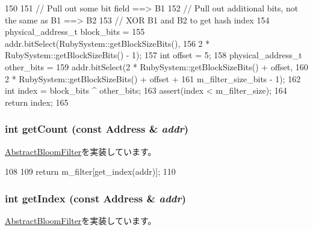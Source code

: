 \begin{DoxyCode}
150 {
151     // Pull out some bit field ==> B1
152     // Pull out additional bits, not the same as B1 ==> B2
153     //  XOR B1 and B2 to get hash index
154     physical_address_t block_bits =
155         addr.bitSelect(RubySystem::getBlockSizeBits(),
156                        2 * RubySystem::getBlockSizeBits() - 1);
157     int offset = 5;
158     physical_address_t other_bits =
159         addr.bitSelect(2 * RubySystem::getBlockSizeBits() + offset,
160                        2 * RubySystem::getBlockSizeBits() + offset +
161                        m_filter_size_bits - 1);
162     int index = block_bits ^ other_bits;
163     assert(index < m_filter_size);
164     return index;
165 }
\end{DoxyCode}
\hypertarget{classBlockBloomFilter_abb722634d5846105b673e9496df8d062}{
\subsubsection[{getCount}]{\setlength{\rightskip}{0pt plus 5cm}int getCount (const {\bf Address} \& {\em addr})}}
\label{classBlockBloomFilter_abb722634d5846105b673e9496df8d062}


\hyperlink{classAbstractBloomFilter_ab6253919ea6ff1b2c17506742b34147d}{AbstractBloomFilter}を実装しています。


\begin{DoxyCode}
108 {
109     return m_filter[get_index(addr)];
110 }
\end{DoxyCode}
\hypertarget{classBlockBloomFilter_a19f42f6f2fc3501021b768f0df8108b2}{
\subsubsection[{getIndex}]{\setlength{\rightskip}{0pt plus 5cm}int getIndex (const {\bf Address} \& {\em addr})}}
\label{classBlockBloomFilter_a19f42f6f2fc3501021b768f0df8108b2}


\hyperlink{classAbstractBloomFilter_a4dd174ae24a8237d41cf0b02c78b896d}{AbstractBloomFilter}を実装しています。


